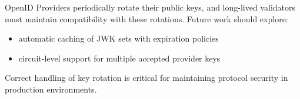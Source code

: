 \documentclass{article}
\begin{document}
OpenID Providers periodically rotate their public keys, and long-lived validators must maintain compatibility with these rotations. Future work should explore:
\begin{itemize}
    \item automatic caching of JWK sets with expiration policies
    \item circuit-level support for multiple accepted provider keys
\end{itemize}

Correct handling of key rotation is critical for maintaining protocol security in production environments.
\end{document}
